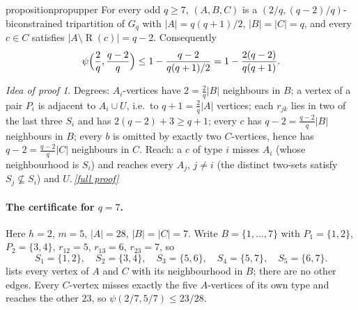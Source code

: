 \documentclass[11pt,a4paper]{article}
\theoremstyle{plain}
\theoremstyle{definition}
\theoremstyle{remark}
\newtheorem*{proofidea}{Idea of proof}
\newcommand{\fullproofref}[1]{\,\hyperref[#1]{\textit{[full proof]}}}
\DeclareMathOperator{\reach}{R}
\begin{document}
\begin{restatable}{proposition}{propupper}\label{prop:upper}
For every odd $q\ge7$, $(A,B,C)$ is a $(2/q,(q-2)/q)$-biconstrained tripartition of $G_q$ with $|A|=q(q+1)/2$, $|B|=|C|=q$, and every $c\in C$ satisfies $|A\setminus\reach(c)|=q-2$. Consequently
\[
 \psi\Bigl(\frac2q,\frac{q-2}q\Bigr)\le1-\frac{q-2}{q(q+1)/2}=1-\frac{2(q-2)}{q(q+1)}.
\]
\end{restatable}

\begin{proofidea}
Degrees: $A_i$-vertices have $2=\frac2q|B|$ neighbours in $B$; a vertex of a pair $P_i$ is adjacent to $A_i\cup U$, i.e.\ to $q+1=\frac2q|A|$ vertices; each $r_{jk}$ lies in two of the last three $S_i$ and has $2(q-2)+3\ge q+1$; every $c$ has $q-2=\frac{q-2}q|B|$ neighbours in $B$; every $b$ is omitted by exactly two $C$-vertices, hence has $q-2=\frac{q-2}q|C|$ neighbours in $C$. Reach: a $c$ of type $i$ misses $A_i$ (whose neighbourhood is $S_i$) and reaches every $A_j$, $j\ne i$ (the distinct two-sets satisfy $S_j\not\subseteq S_i$) and $U$.\fullproofref{pf:upper}
\end{proofidea}

\paragraph{The certificate for $q=7$.}
Here $h=2$, $m=5$, $|A|=28$, $|B|=|C|=7$. Write $B=\{1,\dots,7\}$ with $P_1=\{1,2\}$, $P_2=\{3,4\}$, $r_{12}=5$, $r_{13}=6$, $r_{23}=7$, so
\[
 S_1=\{1,2\},\quad S_2=\{3,4\},\quad S_3=\{5,6\},\quad S_4=\{5,7\},\quad S_5=\{6,7\}.
\]
 lists every vertex of $A$ and $C$ with its neighbourhood in $B$; there are no other edges. Every $C$-vertex misses exactly the five $A$-vertices of its own type and reaches the other $23$, so $\psi(2/7,5/7)\le23/28$.
\end{document}
